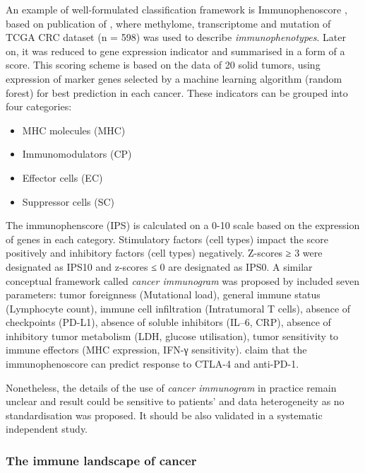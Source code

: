 \documentclass[12pt,]{book}
\providecommand{\tightlist}{%
  \setlength{\itemsep}{0pt}\setlength{\parskip}{0pt}}
\theoremstyle{definition}
\theoremstyle{definition}
\theoremstyle{definition}
\theoremstyle{remark}
\begin{document}
An example of well-formulated classification framework is
Immunophenoscore \citep{Charoentong2017}, based on publication of
\citet{Angelova2015}, where methylome, transcriptome and mutation of
TCGA CRC dataset (n = 598) was used to describe \emph{immunophenotypes}.
Later on, it was reduced to gene expression indicator and summarised in
a form of a score. This scoring scheme is based on the data of 20 solid
tumors, using expression of marker genes selected by a machine learning
algorithm (random forest) for best prediction in each cancer. These
indicators can be grouped into four categories:

\begin{itemize}
\tightlist
\item
  MHC molecules (MHC)
\item
  Immunomodulators (CP)
\item
  Effector cells (EC)
\item
  Suppressor cells (SC)
\end{itemize}

The immunophenscore (IPS) is calculated on a 0-10 scale based on the
expression of genes in each category. Stimulatory factors (cell types)
impact the score positively and inhibitory factors (cell types)
negatively. Z-scores ≥ 3 were designated as IPS10 and z-scores ≤ 0 are
designated as IPS0. A similar conceptual framework called \emph{cancer
immunogram} was proposed by \citet{Blank2016} included seven parameters:
tumor foreignness (Mutational load), general immune status (Lymphocyte
count), immune cell infiltration (Intratumoral T cells), absence of
checkpoints (PD-L1), absence of soluble inhibitors (IL--6, CRP), absence
of inhibitory tumor metabolism (LDH, glucose utilisation), tumor
sensitivity to immune effectors (MHC expression, IFN-γ sensitivity).
\citet{Charoentong2017} claim that the immunophenoscore can predict
response to CTLA-4 and anti-PD-1.

Nonetheless, the details of the use of \emph{cancer immunogram} in
practice remain unclear and result could be sensitive to patients' and
data heterogeneity as no standardisation was proposed. It should be also
validated in a systematic independent study.

\hypertarget{the-immune-landscape-of-cancer}{%
\subsubsection{The immune landscape of
cancer}\label{the-immune-landscape-of-cancer}}
\end{document}
